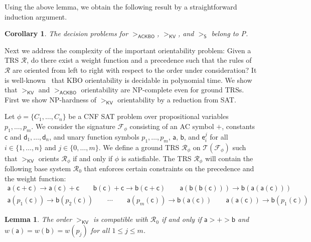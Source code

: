 \documentclass{tlp}
\newcommand{\qed}{\hspace*{1em}\hbox{\proofbox}}
\newtheorem{corollary}[theorem]{Corollary}
\newtheorem{lemma}[theorem]{Lemma}
\newcommand{\m}[1]{\mathsf{#1}}
\newcommand{\mc}[1]{\mathcal{#1}}
\newcommand{\mr}[1]{\mathrm{#1}}
\newcommand{\FF}{\mc{F}}
\newcommand{\TT}{\mc{T}}
\newcommand{\ackbo}{\mr{\m{ACKBO}}}
\newcommand{\steinbach}{\mr{\m{S}}}
\newcommand{\KV}{\mr{\m{KV}}}
\newcommand{\seq}[2][n]{{#2_1},\dots,{#2_{#1}}}
\newcommand{\RR}{\mc{R}}
\newcommand{\High}{\m{a}}
\newcommand{\Low}{\m{b}}
\newcommand{\Bot}{\m{c}}
\newcommand{\Top}{\m{d}}
\newcommand{\ToP}{\m{e}}
\begin{document}
Using the above lemma, we obtain the following result by a straightforward
induction argument.

\begin{corollary}
The decision problems for $>_\ackbo$, $>_\KV$, and $>_\steinbach$
belong to P.
\qed
\end{corollary}

Next we address the complexity of the important orientability problem:
Given a TRS $\RR$, do there exist a weight function and a precedence such
that the rules of $\RR$ are oriented from left to right with respect
to the order under consideration?
It is well-known~\cite{KV03} that KBO orientability is decidable in
polynomial time. We show that $>_\KV$ and $>_\ackbo$
orientability are
NP-complete even for ground TRSs.
First we show NP-hardness of $>_\KV$ orientability by a
reduction from SAT.


Let $\phi = \{ \seq{C} \}$ be a CNF SAT problem over propositional
variables $\seq[m]{p}$. We consider the signature $\FF_\phi$ consisting of
an AC symbol $+$, constants $\Bot$ and $\seq{\Top}$, and unary function
symbols $\seq[m]{p}$, $\High$, $\Low$, and $\ToP_i^j$ for all
$i \in \{ 1, \dots, n \}$ and $j \in \{ 0, \dots, m \}$.  We define a
ground TRS $\RR_\phi$ on $\TT(\FF_\phi)$ such that $>_\KV$ orients
$\RR_\phi$ if and only if $\phi$ is satisfiable.  The TRS $\RR_\phi$ will
contain the following base system $\RR_0$ that enforces certain constraints
on the precedence and the weight function:
\begin{gather*}
\High(\Bot + \Bot) \to \High(\Bot) + \Bot \qquad
\Low(\Bot) + \Bot \to \Low(\Bot + \Bot) \qquad
\High(\Low(\Low(\Bot))) \to \Low(\High(\High(\Bot))) \\
\High(p_1(\Bot)) \to \Low(p_2(\Bot)) \qquad
\cdots \qquad
\High(p_m(\Bot)) \to \Low(\High(\Bot)) \qquad
\High(\High(\Bot)) \to \Low(p_1(\Bot))
\end{gather*}

\begin{lemma}
\label{lem:base}
The order $>_\KV$ is compatible with $\RR_0$ if and only if
$\High > + > \Low$ and $w(\High) = w(\Low) = w(p_j)$ for all
$1 \leqslant j \leqslant m$.
\qed
\end{lemma}
\end{document}
